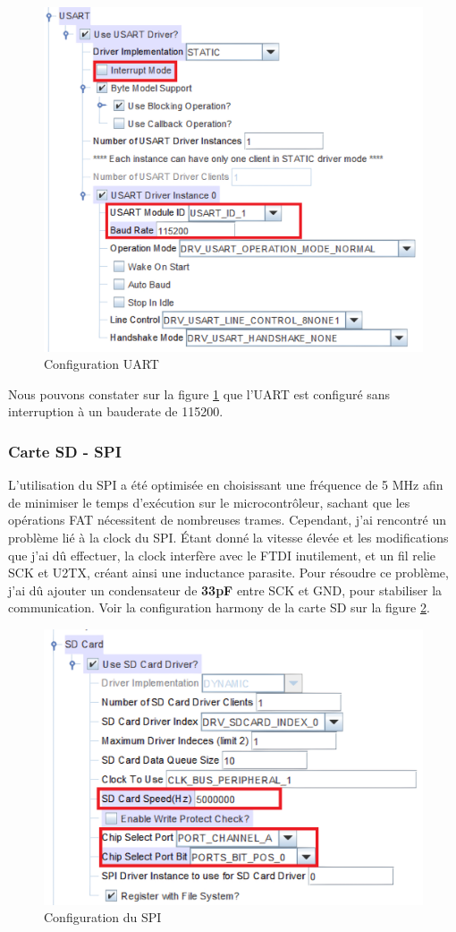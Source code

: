 {	\begin{figure}[h]
		\centering
		\includegraphics[width=0.7\linewidth]{Figures/Dev-SOFT/ConfigUart}
		\caption{Configuration UART}
		\label{fig:configuart}
	\end{figure}
	
	
	Nous pouvons constater sur la figure \ref{fig:configuart} que l'UART est configuré sans interruption à un bauderate de 115200.

	\subsubsection{Carte SD - SPI} 
	{
	L'utilisation du SPI a été optimisée en choisissant une fréquence de 5 MHz afin de minimiser le temps d'exécution sur le microcontrôleur, sachant que les opérations FAT nécessitent de nombreuses trames. Cependant, j'ai rencontré un problème lié à la clock du SPI. Étant donné la vitesse élevée et les modifications que j'ai dû effectuer, la clock interfère avec le FTDI inutilement, et un fil relie SCK et U2TX, créant ainsi une inductance parasite. Pour résoudre ce problème, j'ai dû ajouter un condensateur de \textbf{33pF} entre SCK et GND, pour stabiliser la communication. Voir la configuration harmony de la carte SD sur la figure \ref{fig:configsdspi}.
	\clearpage
	\begin{figure}[h]
		\centering
		\includegraphics[width=0.7\linewidth]{Figures/Dev-SOFT/ConfigSD_SPI}
		\caption{Configuration du SPI}
		\label{fig:configsdspi}
	\end{figure}
	}

}
